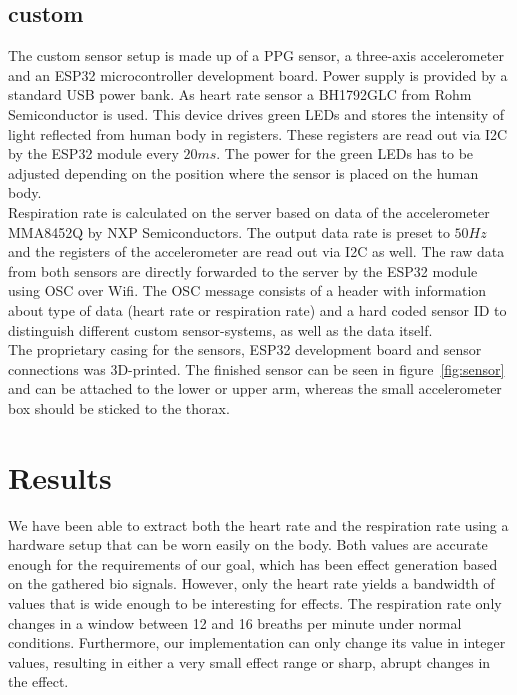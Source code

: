 \documentclass{sigchi-ext}
\begin{document}
\subsection{custom}
The custom sensor setup is made up of a PPG sensor, a three-axis accelerometer and an ESP32 microcontroller development board.
Power supply is provided by a standard USB power bank. As heart rate sensor a BH1792GLC from Rohm Semiconductor is used.
This device drives green LEDs and stores the intensity of light reflected from human body in registers\cite{heartratesensor}.
These registers are read out via I2C by the ESP32 module every $20ms$. The power for the green LEDs has to
be adjusted depending on the position where the sensor is placed on the human body. \\
Respiration rate is calculated on the server based on data of the accelerometer MMA8452Q by NXP Semiconductors.
The output data rate is preset to $50Hz$ and the registers of the accelerometer are read out via I2C as well.
The raw data from both sensors are directly forwarded to the server by the ESP32 module using OSC over Wifi. The OSC message
consists of a header with information about type of data (heart rate or respiration rate) and a hard coded sensor ID to distinguish
different custom sensor-systems, as well as the data itself. \\
The proprietary casing for the sensors, ESP32 development board and sensor connections was 3D-printed. The finished sensor can be
seen in figure~\ref{fig:sensor} and can be attached to the lower or upper arm, whereas the small accelerometer box should be 
sticked to the thorax.
 
\section{Results}

We have been able to extract both the heart rate and the respiration rate using a hardware setup that can be
worn easily on the body. Both values are accurate enough for the requirements of our goal, which has been
effect generation based on the gathered bio signals. However, only the heart rate yields a bandwidth of values
that is wide enough to be interesting for effects. The respiration rate only changes in a window between 12 and 16 breaths per 
minute under normal conditions. Furthermore, our implementation can only change its value in integer values, resulting in either a 
very small effect range or sharp, abrupt changes in the effect. %
\end{document}
